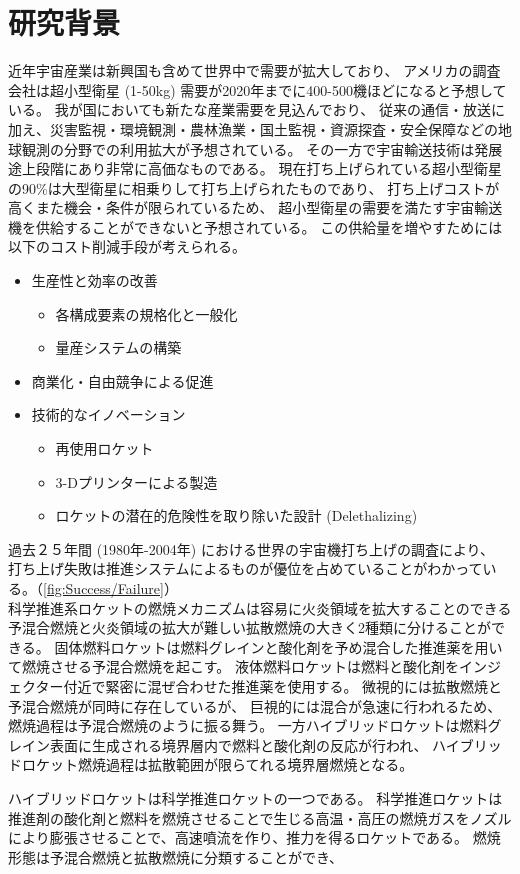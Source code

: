 \section{研究背景}
%
%
近年宇宙産業は新興国も含めて世界中で需要が拡大しており、
アメリカの調査会社は超小型衛星 (1-50kg) 需要が2020年までに400-500機ほどになると予想している。\cite{nano/micro}
我が国においても新たな産業需要を見込んでおり、
従来の通信・放送に加え、災害監視・環境観測・農林漁業・国土監視・資源探査・安全保障などの地球観測の分野での利用拡大が予想されている。
その一方で宇宙輸送技術は発展途上段階にあり非常に高価なものである。
現在打ち上げられている超小型衛星の90\%は大型衛星に相乗りして打ち上げられたものであり、
打ち上げコストが高くまた機会・条件が限られているため、
超小型衛星の需要を満たす宇宙輸送機を供給することができないと予想されている。
この供給量を増やすためには以下のコスト削減手段が考えられる。
\begin{itemize}
	\item 生産性と効率の改善
	\begin{itemize}
		\item 各構成要素の規格化と一般化
		\item 量産システムの構築
	\end{itemize}
	\item 商業化・自由競争による促進
	\item 技術的なイノベーション
	\begin{itemize}
		\item 再使用ロケット
		\item 3-Dプリンターによる製造
		\item ロケットの潜在的危険性を取り除いた設計 (Delethalizing)
	\end{itemize}
\end{itemize}
過去２５年間 (1980年-2004年) における世界の宇宙機打ち上げの調査により、
打ち上げ失敗は推進システムによるものが優位を占めていることがわかっている。（\ref{fig:Success/Failure}）\cite{failure}
\\
科学推進系ロケットの燃焼メカニズムは容易に火炎領域を拡大することのできる予混合燃焼と火炎領域の拡大が難しい拡散燃焼の大きく2種類に分けることができる。
固体燃料ロケットは燃料グレインと酸化剤を予め混合した推進薬を用いて燃焼させる予混合燃焼を起こす。
液体燃料ロケットは燃料と酸化剤をインジェクター付近で緊密に混ぜ合わせた推進薬を使用する。
微視的には拡散燃焼と予混合燃焼が同時に存在しているが、
巨視的には混合が急速に行われるため、燃焼過程は予混合燃焼のように振る舞う。
一方ハイブリッドロケットは燃料グレイン表面に生成される境界層内で燃料と酸化剤の反応が行われ、
ハイブリッドロケット燃焼過程は拡散範囲が限らてれる境界層燃焼となる。


ハイブリッドロケットは科学推進ロケットの一つである。
科学推進ロケットは推進剤の酸化剤と燃料を燃焼させることで生じる高温・高圧の燃焼ガスをノズルにより膨張させることで、高速噴流を作り、推力を得るロケットである。
燃焼形態は予混合燃焼と拡散燃焼に分類することができ、

